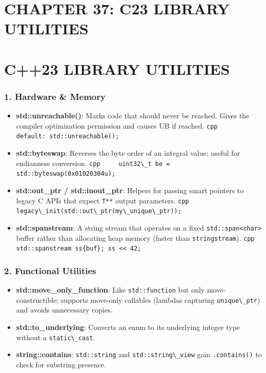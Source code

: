 \hypertarget{chapter-37-c23-library-utilities}{%
\section{CHAPTER 37: C23 LIBRARY
UTILITIES}\label{chapter-37-c23-library-utilities}}

\hypertarget{c23-library-utilities}{%
\section{C++23 LIBRARY UTILITIES}\label{c23-library-utilities}}

\hypertarget{hardware-memory}{%
\subsubsection{1. Hardware \& Memory}\label{hardware-memory}}

\begin{itemize}
\tightlist
\item
  \textbf{std::unreachable()}: Marks code that should never be reached.
  Gives the compiler optimization permission and causes UB if reached.
  \passthrough{\lstinline!cpp     default: std::unreachable();!}
\item
  \textbf{std::byteswap}: Reverses the byte order of an integral value;
  useful for endianness conversion.
  \passthrough{\lstinline!cpp     uint32\_t be = std::byteswap(0x01020304u);!}
\item
  \textbf{std::out\_ptr / std::inout\_ptr}: Helpers for passing smart
  pointers to legacy C APIs that expect \passthrough{\lstinline!T**!}
  output parameters.
  \passthrough{\lstinline!cpp     legacy\_init(std::out\_ptr(my\_unique\_ptr));!}
\item
  \textbf{std::spanstream}: A string stream that operates on a fixed
  \passthrough{\lstinline!std::span<char>!} buffer rather than
  allocating heap memory (faster than
  \passthrough{\lstinline!stringstream!}).
  \passthrough{\lstinline!cpp     std::spanstream ss\{buf\}; ss << 42;!}
\end{itemize}

\hypertarget{functional-utilities}{%
\subsubsection{2. Functional Utilities}\label{functional-utilities}}

\begin{itemize}
\tightlist
\item
  \textbf{std::move\_only\_function}: Like
  \passthrough{\lstinline!std::function!} but only move-constructible;
  supports move-only callables (lambdas capturing
  \passthrough{\lstinline!unique\_ptr!}) and avoids unnecessary copies.
\item
  \textbf{std::to\_underlying}: Converts an enum to its underlying
  integer type without a \passthrough{\lstinline!static\_cast!}.
\item
  \textbf{string::contains}: \passthrough{\lstinline!std::string!} and
  \passthrough{\lstinline!std::string\_view!} gain
  \passthrough{\lstinline!.contains()!} to check for substring presence.
\end{itemize}

